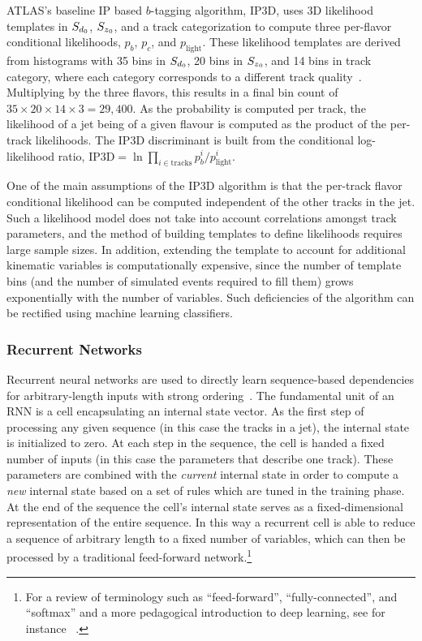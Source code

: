 ATLAS's baseline IP based $b$-tagging algorithm, IP3D, uses 3D likelihood templates in $S_{d{_0}}$, $S_{z{_0}}$, and a track categorization to compute three per-flavor conditional likelihoods, $p_b$, $p_c$, and $p_{\textrm{light}}$. These likelihood templates are derived from histograms with 35 bins in $S_{d{_0}}$, 20 bins in $S_{z{_0}}$, and 14 bins in track category, where each category corresponds to a different track quality~\cite{ATL-PHYS-PUB-2015-022}. Multiplying by the three flavors, this results in a final bin count of $35 \times 20 \times 14 \times 3 = 29,400$. As the probability is computed per track, the likelihood of a jet being of a given flavour is computed as the product of the per-track likelihoods. The IP3D discriminant is built from the conditional log-likelihood ratio, $\textrm{IP3D}=\ln \prod_{i \in \textrm{tracks}} p_b^i / p_{\textrm{light}}^i$.

One of the main assumptions of the IP3D algorithm is that the per-track flavor conditional likelihood can be computed independent of the other tracks in the jet.  Such a likelihood model does not take into account correlations amongst track parameters, and the method of building templates to define likelihoods requires large sample sizes. 
In addition, extending the template to account for additional kinematic variables is computationally expensive, since the number of template bins (and the number of simulated events required to fill them) grows exponentially with the number of variables.
Such deficiencies of the algorithm can be rectified using machine learning classifiers.


\subsubsection{Recurrent Networks}

Recurrent neural networks are used to directly learn sequence-based dependencies for arbitrary-length inputs with strong ordering~\cite{ref:RNNthesis, dlbook}. The fundamental unit of an RNN is a cell encapsulating an internal state vector. As the first step of processing any given sequence (in this case the tracks in a jet), the internal state is initialized to zero. At each step in the sequence, the cell is handed a fixed number of inputs (in this case the parameters that describe one track). These parameters are combined with the \emph{current} internal state in order to compute a \emph{new} internal state based on a set of rules which are tuned in the training phase. At the end of the sequence the cell's internal state serves as a fixed-dimensional representation of the entire sequence. In this way a recurrent cell is able to reduce a sequence of arbitrary length to a fixed number of variables, which can then be processed by a traditional feed-forward network.\footnote{For a review of terminology such as ``feed-forward'', ``fully-connected'', and ``softmax'' and a more pedagogical introduction to deep learning, see for instance ~\cite{dlbook,2014arXiv1404.7828S}.}


